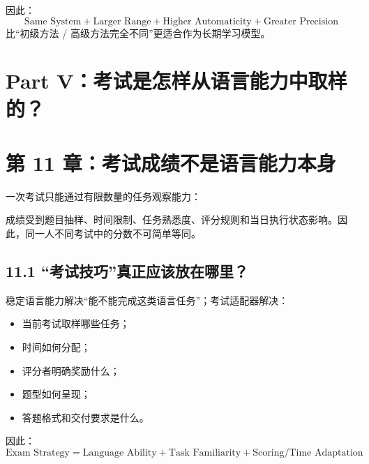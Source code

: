\documentclass[11pt,a4paper]{ctexart}
\begin{document}
因此：
\[
\boxed{
\text{Same System}
+
\text{Larger Range}
+
\text{Higher Automaticity}
+
\text{Greater Precision}
}
\]
比“初级方法 / 高级方法完全不同”更适合作为长期学习模型。

\newpage
\section{Part V：考试是怎样从语言能力中取样的？}

\section{第 11 章：考试成绩不是语言能力本身}
一次考试只能通过有限数量的任务观察能力：
\begin{center}
\end{center}
成绩受到题目抽样、时间限制、任务熟悉度、评分规则和当日执行状态影响。因此，同一人不同考试中的分数不可简单等同。

\subsection{11.1 “考试技巧”真正应该放在哪里？}
稳定语言能力解决“能不能完成这类语言任务”；考试适配器解决：
\begin{itemize}
  \item 当前考试取样哪些任务；
  \item 时间如何分配；
  \item 评分者明确奖励什么；
  \item 题型如何呈现；
  \item 答题格式和交付要求是什么。
\end{itemize}

因此：
\[
\boxed{
\text{Exam Strategy}
=
\text{Language Ability}
+
\text{Task Familiarity}
+
\text{Scoring/Time Adaptation}
}
\]
\end{document}
